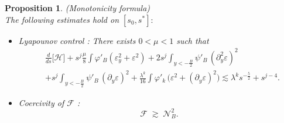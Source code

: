 \documentclass[16pt,english, oneside,reqno]{smfart}
\newcommand{\vare}{{\varepsilon}}
\newcommand{\vphi}{{\varphi}}
\newtheorem{proposition}[theorem]{Proposition}
\begin{document}
\vspace{0.2cm}
\begin{proposition}(Monotonicity formula)\label{Proposition_Monot_formula}\\
The following estimates hold on $[s_0,s^*]:$
\begin{itemize}
    \item Lyapounov control : There exists $0<\mu<1$ such that
    \begin{equation}\label{Lyapounov_control_of_H}
    \begin{split}
        & \frac{d}{ds}\big[\mathcal{H}\big]+s^{j}\frac{\mu}{8}\int\vphi'_B(\vare_y^2+\vare^2) +2s^{j}\int_{y<-\frac B2}\psi'_B\,(\partial^2_y\vare)^2\\
        & +s^{j}\int_{y<-\frac B2} \psi'_B\,(\partial_y \vare)^2 +\frac{\lambda^k}{16}\int \vphi'_k\,\big(\vare^2 + (\partial_y\vare)^2 \big)
        \lesssim \lambda^ks^{ - \frac 52} + s^{j-4}.
    \end{split}
    \end{equation}
    \item Coercivity of $\mathcal{F} $ :  
    \begin{equation}\label{coercivity_of_mathcal_F}
        \mathcal{F}\;\gtrsim\;\mathcal{N}^2_B.
    \end{equation}
\end{itemize}
\end{proposition}


\end{document}
